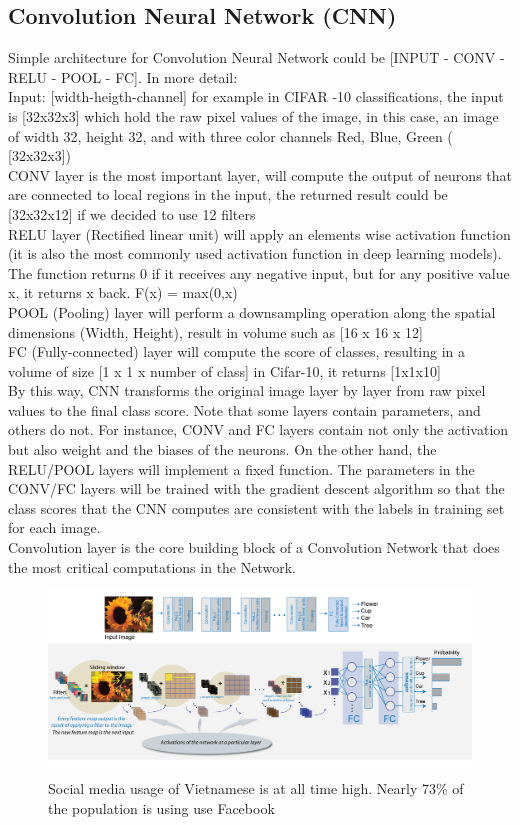 \subsection{Convolution Neural Network (CNN)}
Simple architecture for Convolution Neural Network could be [INPUT - CONV - RELU - POOL - FC]. In more detail:\\
Input: [width-heigth-channel] for example in CIFAR -10 classifications, the input is [32x32x3] which hold the raw pixel values of the image, in this case, an image of width 32, height 32, and with three color channels Red, Blue, Green ( [32x32x3])\\
CONV layer is the most important layer, will compute the output of neurons that are connected to local regions in the input, the returned result could be [32x32x12] if we decided to use 12 filters\\
RELU layer (Rectified linear unit) will apply an elements wise activation function (it is also the most commonly used activation function in deep learning models). The function returns 0 if it receives any negative input, but for any positive value x, it returns x back. F(x) = max(0,x)\\
POOL (Pooling) layer will perform a downsampling operation along the spatial dimensions (Width, Height), result in volume such as [16 x 16 x 12]\\
FC (Fully-connected) layer will compute the score of classes, resulting in a volume of size [1 x 1 x number of class] in Cifar-10, it returns [1x1x10]\\
By this way, CNN transforms the original image layer by layer from raw pixel values to the final class score. Note that some layers contain parameters, and others do not. For instance, CONV and FC layers contain not only the activation but also weight and the biases of the neurons. On the other hand, the RELU/POOL layers will implement a fixed function. The parameters in the CONV/FC layers will be trained with the gradient descent algorithm so that the class scores that the CNN computes are consistent with the labels in training set for each image.\\
Convolution layer is the core building block of a Convolution Network that does the most critical computations in the Network.
\begin{center}
  \begin{figure}[H]
  \centering
  \includegraphics[width=1\columnwidth]{images/chap2/Intro_CNN.png}
  \caption{Social media usage of Vietnamese is at all time high. Nearly 73\% of the population is using use Facebook}
  \label{chap2:CNN_intro}
  \end{figure}
\end{center}

